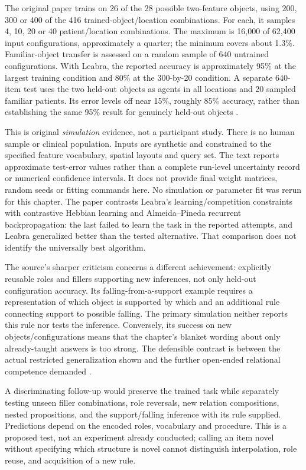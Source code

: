 The original paper trains on 26 of the 28 possible two-feature objects,
using 200, 300 or 400 of the 416 trained-object/location combinations.
For each, it samples 4, 10, 20 or 40 patient/location combinations.
The maximum is 16,000 of 62,400 input configurations, approximately a
quarter; the minimum covers about 1.3\%. Familiar-object transfer is
assessed on a random sample of 640 untrained configurations. With
Leabra, the reported accuracy is approximately 95\% at the largest
training condition and 80\% at the 300-by-20 condition. A separate
640-item test uses the two held-out objects as agents in all locations
and 20 sampled familiar patients. Its error levels off near 15\%,
roughly 85\% accuracy, rather than establishing the same 95\% result
for genuinely held-out objects
\parencite[pp.~6--7, Figs.~4--5]{OReillyBusby2002Binding}.

This is original \emph{simulation} evidence, not a participant study.
There is no human sample or clinical population. Inputs are synthetic
and constrained to the specified feature vocabulary, spatial layouts
and query set. The text reports approximate test-error values rather
than a complete run-level uncertainty record or numerical confidence
intervals. It does not provide final weight matrices, random seeds or fitting
commands here. No simulation or parameter fit was rerun for this
chapter. The paper contrasts Leabra's learning/competition constraints
with contrastive Hebbian learning and Almeida--Pineda recurrent
backpropagation: the last failed to learn the task in the reported
attempts, and Leabra generalized better than the tested alternative.
That comparison does not identify the universally best algorithm.

The source's sharper criticism concerns a different achievement:
explicitly reusable roles and fillers supporting new inferences, not
only held-out configuration accuracy. Its falling-from-a-support example
requires a representation of which object is supported by which and
an additional rule connecting support to possible falling. The primary
simulation neither reports this rule nor tests the inference. Conversely,
its success on new objects/configurations means that the chapter's
blanket wording about only already-taught answers is too strong.
The defensible contrast is between the actual restricted generalization
shown and the further open-ended relational competence demanded
\parencite[pp.~59--60]{DoumasHummel2012HigherCognition}
\parencite[pp.~6--8]{OReillyBusby2002Binding}.

A discriminating follow-up would preserve the trained task while
separately testing unseen filler combinations, role reversals, new
relation compositions, nested propositions, and the support/falling
inference with its rule supplied. Predictions depend on the encoded
roles, vocabulary and procedure. This is a proposed test, not an
experiment already conducted; calling an item novel without specifying
which structure is novel cannot distinguish interpolation, role reuse,
and acquisition of a new rule.

